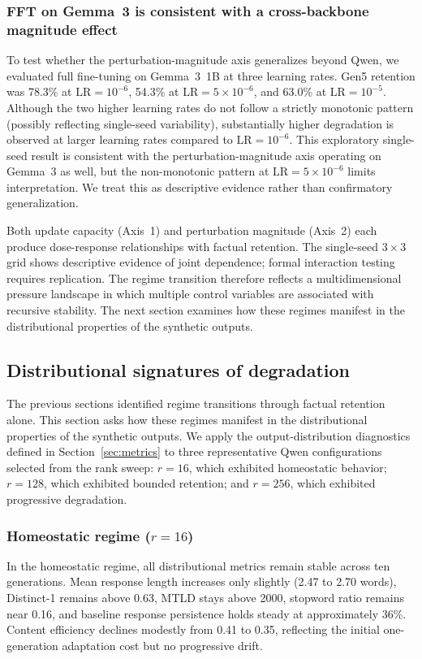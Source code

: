 \documentclass[a4paper,fleqn]{cas-dc}
\newif\ifshowchanges
\newcommand{\rev}[1]{\ifshowchanges{\color{blue}#1}\else{#1}\fi}
\begin{document}
\subsubsection{
\rev{FFT on Gemma~3 is consistent with a cross-backbone magnitude effect}}

To test whether the perturbation-magnitude axis generalizes beyond Qwen, we
evaluated full fine-tuning on Gemma~3~1B at three learning rates. Gen5 retention
was 78.3\% at $\mathrm{LR}=10^{-6}$, 54.3\% at $\mathrm{LR}=5 \times 10^{-6}$,
and 63.0\% at $\mathrm{LR}=10^{-5}$. Although the two higher learning rates do
not follow a strictly monotonic pattern (possibly reflecting single-seed
variability), substantially higher degradation is observed at larger learning
rates compared to $\mathrm{LR}=10^{-6}$. \rev{This exploratory single-seed result is consistent with the perturbation-magnitude
axis operating on Gemma~3 as well, but the non-monotonic pattern at $\mathrm{LR}=5\times10^{-6}$
limits interpretation. We treat this as descriptive evidence rather than
confirmatory generalization.}

Both update capacity (Axis~1) and perturbation magnitude (Axis~2) each produce
dose-response relationships with factual retention. \rev{The single-seed $3{\times}3$ grid shows descriptive evidence of joint dependence; formal interaction testing requires replication.} The regime transition therefore reflects a
multidimensional pressure landscape in which multiple control variables are
associated with recursive stability. The next section examines how these regimes
manifest in the distributional properties of the synthetic outputs.

\subsection{Distributional signatures of degradation}\label{sec:res_distribution}

The previous sections identified regime transitions through factual retention
alone. This section asks how these regimes manifest in the distributional
properties of the synthetic outputs. We apply the output-distribution diagnostics
defined in Section~\ref{sec:metrics} to three representative Qwen configurations
selected from the rank sweep: $r=16$, which exhibited homeostatic behavior;
$r=128$, which exhibited bounded retention; and $r=256$, which exhibited
progressive degradation.

\subsubsection{Homeostatic regime ($r=16$)}
In the homeostatic regime, all distributional metrics remain stable across ten
generations. Mean response length increases only slightly (2.47 to 2.70 words),
Distinct-1 remains above 0.63, MTLD stays above 2000, stopword ratio remains
near 0.16, and baseline response persistence holds steady at approximately 36\%.
Content efficiency declines modestly from 0.41 to 0.35, reflecting the initial
one-generation adaptation cost but no progressive drift.
\end{document}
